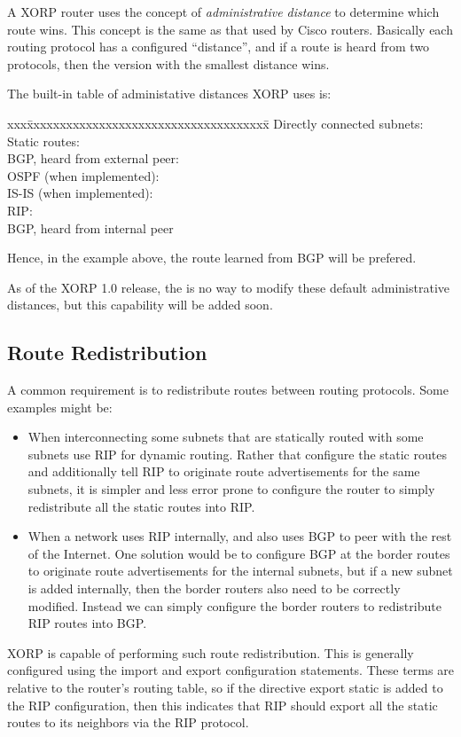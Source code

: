 A XORP router uses the concept of {\it administrative distance} to
determine which route wins.  This concept is the same as that used by
Cisco routers.  Basically each routing protocol has a configured
``distance'', and if a route is heard from two protocols, then the
version with the smallest distance wins.

The built-in table of administative distances XORP uses is:
\begin{tabbing}
xxx\=xxxxxxxxxxxxxxxxxxxxxxxxxxxxxxxxxxxxx\=\kill
\>Directly connected subnets: \\
\>Static routes:\\
\>BGP, heard from external peer:\\
\>OSPF (when implemented):\\
\>IS-IS (when implemented):\\
\>RIP:\\
\>BGP, heard from internal peer\\
\end{tabbing}
Hence, in the example above, the route learned from BGP will be prefered.

As of the XORP 1.0 release, the is no way to modify these default
administrative distances, but this capability will be added soon.

\subsection{Route Redistribution}

A common requirement is to redistribute routes between routing
protocols.  Some examples might be:
\begin{itemize}
\item When interconnecting some subnets that are statically routed
  with some subnets use RIP for dynamic routing.  Rather
  that configure the static routes and additionally tell RIP to
  originate route advertisements for the same subnets, it is simpler
  and less error prone to configure the router to simply redistribute
  all the static routes into RIP.
\item When a network uses RIP internally, and also uses BGP to
  peer with the rest of the Internet.  One solution would be to
  configure BGP at the border routes to originate route advertisements
  for the internal subnets, but if a new subnet is added internally,
  then the border routers also need to be correctly modified.  Instead
  we can simply configure the border routers to redistribute RIP
  routes into BGP.  
\end{itemize}
XORP is capable of performing such route redistribution.  This is
generally configured using the {\stt import} and {\stt export}
configuration statements.  These terms are relative to the router's
routing table, so if the directive {\stt export static} is added to
the RIP configuration, then this indicates that RIP should export all
the static routes to its neighbors via the RIP protocol.

